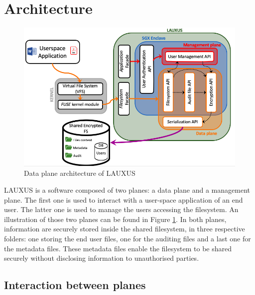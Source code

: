 \documentclass[../main.tex]{subfiles}
\begin{document}
\section{Architecture}
\label{section:lauxus:architecture}

\begin{figure}[ht]
    \centering
    \includegraphics[width=\textwidth]{images/lauxus/architecture}
    
    \caption{Data plane architecture of LAUXUS}
    \label{figure:approach:architecture}
\end{figure}
\par LAUXUS is a software composed of two planes: a data plane and a management plane. The first one is used to interact with a user-space application of an end user. The latter one is used to manage the users accessing the filesystem. An illustration of those two planes can be found in Figure \ref{figure:approach:architecture}. In both planes, information are securely stored inside the shared filesystem, in three respective folders: one storing the end user files, one for the auditing files and a last one for the metadata files. These metadata files enable the filesystem to be shared securely without disclosing information to unauthorised parties.


\subsection{Interaction between planes}
\label{section:lauxus:architecture_process}
\end{document}
